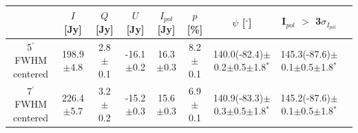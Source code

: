 \documentclass[twocolumn,traditabstract]{aa}
\begin{document}
\begin{table}
  \centering
      \begin{tabular}{ccccccccc}
      \hline
      \hline
       & \small $I$ [Jy] & \small $Q$ [Jy] & \small $U$ [Jy] & \small $I_{pol}$ [Jy] & \small $p$ [\%] & \small $\psi$ [$^\circ$] & \small I$_{pol}$ $>$ 3$\sigma_{I_{pol}}$ \\
      \hline
\small 5$^{\prime}$ FWHM centered & \small 198.9$\pm$4.8  & \small 2.8$\pm$0.1 & \small -16.1$\pm$0.2 & \small 16.3$\pm$0.3 & \small 8.2$\pm$0.1 & \small 140.0(-82.4)$\pm$0.2$\pm$0.5$\pm$1.8$^*$ & \small 145.3(-87.6)$\pm$0.1$\pm$0.5$\pm$1.8$^*$ \\ 

	\small 7$^{\prime}$ FWHM centered & \small 226.4$\pm$5.7 & \small 3.2$\pm$0.2 & \small -15.2$\pm$0.3 & \small 15.6$\pm$0.3 & \small 6.9$\pm$0.1 & \small 140.9(-83.3)$\pm$0.3$\pm$0.5$\pm$1.8$^*$ & \small 145.2(-87.6)$\pm$0.1$\pm$0.5$\pm$1.8$^*$\\ 

 
     	      


\end{tabular}
\end{table}
\end{document}
